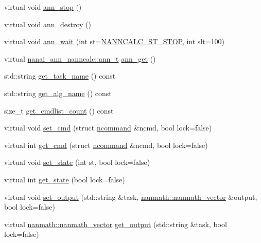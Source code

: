 \begin{DoxyCompactItemize}
virtual void \hyperlink{classnanai_1_1nanai__ann__nanncalc_ab7c70e33ab6d4ddcc46fcbdd69a14281}{ann\+\_\+stop} ()
\item 
virtual void \hyperlink{classnanai_1_1nanai__ann__nanncalc_a4fb9643a590238c96e8e387022626bd6}{ann\+\_\+destroy} ()
\item 
virtual void \hyperlink{classnanai_1_1nanai__ann__nanncalc_a7b69abc3ab21a6249f360f2c8f319501}{ann\+\_\+wait} (int st=\hyperlink{nanai__ann__nanncalc_8h_abf1ad245b3da2bb8ed628a379ea2c939}{N\+A\+N\+N\+C\+A\+L\+C\+\_\+\+S\+T\+\_\+\+S\+T\+O\+P}, int slt=100)
\item 
virtual \hyperlink{classnanai_1_1nanai__ann__nanncalc_1_1ann__t}{nanai\+\_\+ann\+\_\+nanncalc\+::ann\+\_\+t} \hyperlink{classnanai_1_1nanai__ann__nanncalc_a41ca7081ea2c4244c7013b8edc86e6ba}{ann\+\_\+get} ()
\item 
std\+::string \hyperlink{classnanai_1_1nanai__ann__nanncalc_aa75fcea728a087178b4699a2e2e86a6f}{get\+\_\+task\+\_\+name} () const 
\item 
std\+::string \hyperlink{classnanai_1_1nanai__ann__nanncalc_a19cc8a310068a44c568ada1c9e72d028}{get\+\_\+alg\+\_\+name} () const 
\item 
size\+\_\+t \hyperlink{classnanai_1_1nanai__ann__nanncalc_aa3adf3454d9953ae48e3b0f98ea0cee0}{get\+\_\+cmdlist\+\_\+count} () const 
\item 
virtual void \hyperlink{classnanai_1_1nanai__ann__nanncalc_a0db0e8b62dbea77377e40a5d39f6265c}{set\+\_\+cmd} (struct \hyperlink{structnanai_1_1nanai__ann__nanncalc_1_1ncommand}{ncommand} \&ncmd, bool lock=false)
\item 
virtual int \hyperlink{classnanai_1_1nanai__ann__nanncalc_a18869c97f279df6aa8d467c32fdc7944}{get\+\_\+cmd} (struct \hyperlink{structnanai_1_1nanai__ann__nanncalc_1_1ncommand}{ncommand} \&ncmd, bool lock=false)
\item 
virtual void \hyperlink{classnanai_1_1nanai__ann__nanncalc_a2c8aa9f4f29bb093f0bc26fa9ba6cc41}{set\+\_\+state} (int st, bool lock=false)
\item 
virtual int \hyperlink{classnanai_1_1nanai__ann__nanncalc_abc792abf872514a95a9863cbb3e49cd4}{get\+\_\+state} (bool lock=false)
\item 
virtual void \hyperlink{classnanai_1_1nanai__ann__nanncalc_ad184946b500d44e38c77e920d7a23fa2}{set\+\_\+output} (std\+::string \&task, \hyperlink{classnanmath_1_1nanmath__vector}{nanmath\+::nanmath\+\_\+vector} \&output, bool lock=false)
\item 
virtual \hyperlink{classnanmath_1_1nanmath__vector}{nanmath\+::nanmath\+\_\+vector} \hyperlink{classnanai_1_1nanai__ann__nanncalc_a04e58c02bf3756d916652e7d021822ad}{get\+\_\+output} (std\+::string \&task, bool lock=false)

\end{DoxyCompactItemize}
